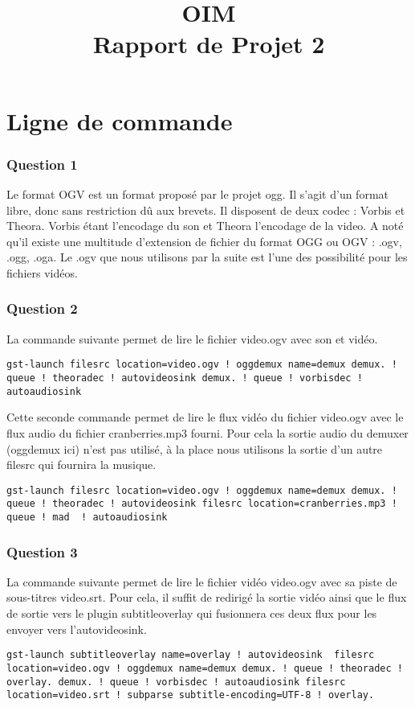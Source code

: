 \documentclass[10pt,a4paper]{article}
\title{OIM\\ Rapport de Projet 2}
\date{}
\begin{document}
\maketitle

\part*{Ligne de commande}
\section*{Question 1}
Le format OGV est un format proposé par le projet ogg. Il s'agit d'un format libre, donc sans restriction dû aux brevets. Il disposent de deux codec : Vorbis et Theora. Vorbis étant l'encodage du son et Theora l'encodage de la video. A noté qu'il existe une multitude d'extension de fichier du format OGG ou OGV : .ogv, .ogg, .oga. Le .ogv que nous utilisons par la suite est l'une des possibilité pour les fichiers vidéos.
\section*{Question 2}

La commande suivante permet de lire le fichier video.ogv avec son et vidéo. 
\begin{lstlisting}
gst-launch filesrc location=video.ogv ! oggdemux name=demux demux. ! queue ! theoradec ! autovideosink demux. ! queue ! vorbisdec ! autoaudiosink 
\end{lstlisting}

Cette seconde commande permet de lire le flux vidéo du fichier video.ogv avec le flux audio du fichier cranberries.mp3 fourni. Pour cela la sortie audio du demuxer (oggdemux ici) n'est pas utilisé, à la place nous utilisons la sortie d'un autre filesrc qui fournira la musique.
\begin{lstlisting}
gst-launch filesrc location=video.ogv ! oggdemux name=demux demux. ! queue ! theoradec ! autovideosink filesrc location=cranberries.mp3 ! queue ! mad  ! autoaudiosink
\end{lstlisting}

\section*{Question 3}

La commande suivante permet de lire le fichier vidéo video.ogv avec sa piste de sous-titres video.srt. Pour cela, il suffit de redirigé la sortie vidéo ainsi que le flux de sortie vers le plugin subtitleoverlay qui fusionnera ces deux flux pour les envoyer vers l'autovideosink.
\begin{lstlisting}
gst-launch subtitleoverlay name=overlay ! autovideosink  filesrc location=video.ogv ! oggdemux name=demux demux. ! queue ! theoradec ! overlay. demux. ! queue ! vorbisdec ! autoaudiosink filesrc location=video.srt ! subparse subtitle-encoding=UTF-8 ! overlay.

\end{lstlisting}
\end{document}
